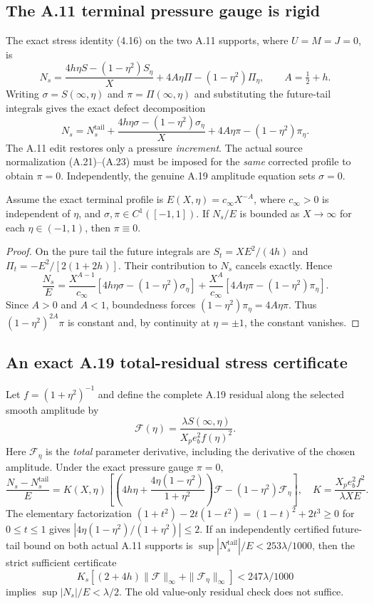 \subsection*{The A.11 terminal pressure gauge is rigid}
The exact stress identity (4.16) on the two A.11 supports, where
$U=M=J=0$, is
\[
N_s=\frac{4h\eta S-(1-\eta^2)S_\eta}{X}
+4A\eta\Pi-(1-\eta^2)\Pi_\eta,\qquad A=\tfrac12+h.
\]
Writing $\sigma=S(\infty,\eta)$ and $\pi=\Pi(\infty,\eta)$
and substituting the future-tail integrals gives the exact defect
decomposition
\[
N_s=N_s^{\mathrm{tail}}+
\frac{4h\eta\sigma-(1-\eta^2)\sigma_\eta}{X}
+4A\eta\pi-(1-\eta^2)\pi_\eta.
\]
The A.11 edit restores only a pressure \emph{increment}.
The actual source normalization (A.21)--(A.23) must be imposed
for the \emph{same} corrected profile to obtain $\pi=0$.
Independently, the genuine A.19 amplitude equation sets $\sigma=0$.

\begin{proposition}
Assume the exact terminal profile is
$E(X,\eta)=c_\infty X^{-A}$, where $c_\infty>0$ is independent
of $\eta$, and $\sigma,\pi\in C^1([-1,1])$.
If $N_s/E$ is bounded as $X\to\infty$ for each
$\eta\in(-1,1)$, then $\pi\equiv0$.
\end{proposition}
\begin{proof}
On the pure tail the future integrals are
$S_t=XE^2/(4h)$ and
$\Pi_t=-E^2/[2(1+2h)]$. Their contribution to
$N_s$ cancels exactly. Hence
\[
\frac{N_s}{E}=
\frac{X^{A-1}}{c_\infty}
[4h\eta\sigma-(1-\eta^2)\sigma_\eta]
+\frac{X^A}{c_\infty}
[4A\eta\pi-(1-\eta^2)\pi_\eta].
\]
Since $A>0$ and $A<1$, boundedness forces
$(1-\eta^2)\pi_\eta=4A\eta\pi$.
Thus $(1-\eta^2)^{2A}\pi$ is constant and, by
continuity at $\eta=\pm1$, the constant vanishes.
\end{proof}

\subsection*{An exact A.19 total-residual stress certificate}
Let $f=(1+\eta^2)^{-1}$ and define the complete A.19
residual along the selected smooth amplitude by
\[
\mathcal F(\eta)=
\frac{\lambda S(\infty,\eta)}{X_p e_b^2 f(\eta)^2}.
\]
Here $\mathcal F_\eta$ is the \emph{total} parameter derivative,
including the derivative of the chosen amplitude.
Under the exact pressure gauge $\pi=0$,
\[
\frac{N_s-N_s^{\mathrm{tail}}}{E}=
K(X,\eta)\left[
\left(4h\eta+\frac{4\eta(1-\eta^2)}{1+\eta^2}\right)
\mathcal F-(1-\eta^2)\mathcal F_\eta\right],
\quad
K=\frac{X_p e_b^2 f^2}{\lambda XE}.
\]
The elementary factorization
$(1+t^2)-2t(1-t^2)=(1-t)^2+2t^3\ge0$
for $0\le t\le1$ gives
$|4\eta(1-\eta^2)/(1+\eta^2)|\le2$.
If an independently certified future-tail bound on
both actual A.11 supports is
$\sup|N_s^{\mathrm{tail}}|/E<253\lambda/1000$,
then the strict sufficient certificate
\[
K_s[(2+4h)\|\mathcal F\|_\infty+
\|\mathcal F_\eta\|_\infty]<247\lambda/1000
\]
implies $\sup|N_s|/E<\lambda/2$.
The old value-only residual check does not suffice.

